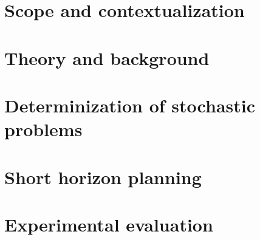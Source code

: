 \documentclass[11pt,a4paper,oldfontcommands,oneside]{memoir}
\begin{document}



\cleardoublepage


\cleardoublepage



\cleardoublepage


\setcounter{secnumdepth}{2}
\setcounter{tocdepth}{2}

\tableofcontents

\cleardoublepage


%

\chapter{Scope and contextualization}
\label{chap:scope}


\chapter{Theory and background}
\label{chap:theory}


\chapter{Determinization of stochastic problems}
\label{chap:determinization}


\chapter{Short horizon planning}
\label{chap:short-horizon-planning}


\chapter{Experimental evaluation}
\label{chap:experimental}

\end{document}
